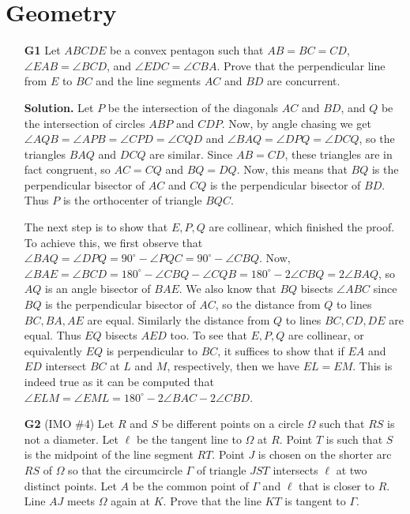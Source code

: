 \documentclass[11pt,a4paper]{article}
\begin{document}
\section{Geometry}
\begin{enumerate}
	\item[\textbf{G1}] Let $ABCDE$ be a convex pentagon such that $AB=BC=CD$, $\angle{EAB}=\angle{BCD}$, and $\angle{EDC}=\angle{CBA}$. Prove that the perpendicular line from $E$ to $BC$ and the line segments $AC$ and $BD$ are concurrent.
	
	\textbf{Solution.} Let $P$ be the intersection of the diagonals $AC$ and $BD$, and $Q$ be the intersection of circles $ABP$ and $CDP$. Now, by angle chasing we get $\angle AQB=\angle APB=\angle CPD=\angle CQD$ and $\angle BAQ=\angle DPQ=\angle DCQ$, so the triangles $BAQ$ and $DCQ$ are similar. Since $AB=CD$, these triangles are in fact congruent, so $AC=CQ$ and $BQ=DQ$. Now, this means that $BQ$ is the perpendicular bisector of $AC$ and $CQ$ is the perpendicular bisector of $BD$. Thus $P$ is the orthocenter of triangle $BQC$. 
	
	The next step is to show that $E, P, Q$ are collinear, which finished the proof. To achieve this, we first observe that $\angle BAQ=\angle DPQ= 90^{\circ}-\angle PQC=90^{\circ} - \angle CBQ$. Now, $\angle BAE=\angle BCD=180^{\circ} - \angle CBQ - \angle CQB = 180^{\circ} - 2\angle CBQ=2\angle BAQ$, so $AQ$ is an angle bisector of $BAE$. We also know that $BQ$ bisects $\angle ABC$ since $BQ$ is the perpendicular bisector of $AC$, so the distance from $Q$ to lines $BC, BA, AE$ are equal. Similarly the distance from $Q$ to lines $BC, CD, DE$ are equal. Thus $EQ$ bisects $AED$ too. To see that $E, P, Q$ are collinear, or equivalently $EQ$ is perpendicular to $BC$, it suffices to show that if $EA$ and $ED$ intersect $BC$ at $L$ and $M$, respectively, then we have $EL=EM$. This is indeed true as it can be computed that $\angle ELM=\angle EML=180^{\circ} - 2\angle BAC- 2\angle CBD$. 
	
	\item[\textbf{G2}] (IMO \#4) Let $R$ and $S$ be different points on a circle $\Omega$ such that $RS$ is not a diameter. Let $\ell$ be the tangent line to $\Omega$ at $R$. Point $T$ is such that $S$ is the midpoint of the line segment $RT$. Point $J$ is chosen on the shorter arc $RS$ of $\Omega$ so that the circumcircle $\Gamma$ of triangle $JST$ intersects $\ell$ at two distinct points. Let $A$ be the common point of $\Gamma$ and $\ell$ that is closer to $R$. Line $AJ$ meets $\Omega$ again at $K$. Prove that the line $KT$ is tangent to $\Gamma$.
	

\end{enumerate}
\end{document}
